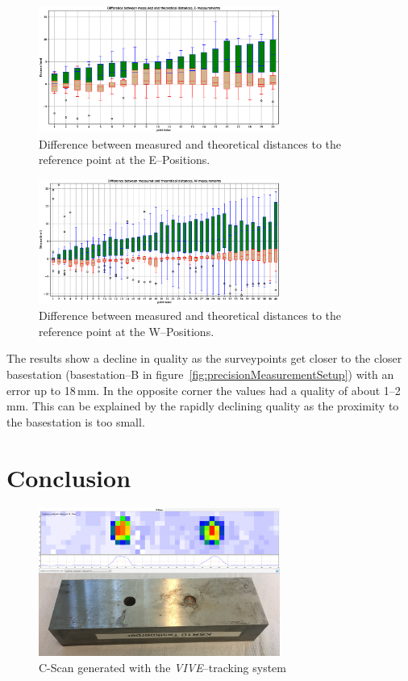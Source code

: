 \documentclass{VRARWorkshop}
\begin{document}
\begin{figure}[h!]
    \begin{center}
        \includegraphics[width=79mm]{images/distancesBoxplot-E.eps}
        \caption{\label{fig:boxplotE} Difference between measured and theoretical distances to the reference point at the E--Positions.}
    \end{center}
\end{figure}

\begin{figure}[h!]
    \begin{center}
        \includegraphics[width=79mm]{images/distancesBoxplot-W.eps}
        \caption{\label{fig:boxplotW} Difference between measured and theoretical distances to the reference point at the W--Positions.}
    \end{center}
\end{figure}

The results show a decline in quality as the surveypoints get closer to the closer basestation (basestation--B in figure~\ref{fig:precisionMeasurementSetup}) with an error up to 18\,mm.
In the opposite corner the values had a quality of about 1--2\,mm.
This can be explained by the rapidly declining quality as the proximity to the basestation is too small.

\section{Conclusion}

\begin{figure}[h!]
    \begin{center}
        \includegraphics[width=79mm]{images/CScanARUS.jpg}
        \caption{\label{fig:resultCScan} C-Scan generated with the \textit{VIVE}--tracking system}
    \end{center}
\end{figure}

\VRARsetbibstyle

\end{document}
